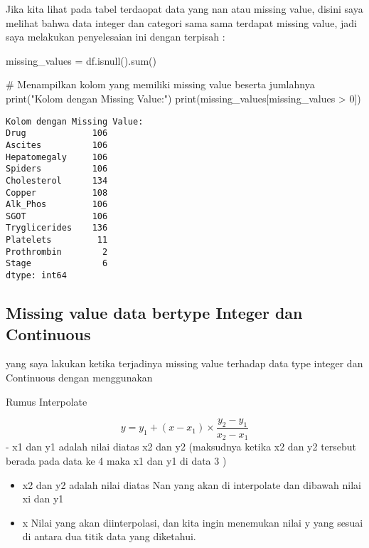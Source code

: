 \documentclass[
  letterpaper,
]{krantz}
\makeatletter
\newenvironment{Shaded}{\begin{snugshade}}{\end{snugshade}}
\newcommand{\BuiltInTok}[1]{\textcolor[rgb]{0.00,0.23,0.31}{#1}}
\newcommand{\CommentTok}[1]{\textcolor[rgb]{0.37,0.37,0.37}{#1}}
\newcommand{\DecValTok}[1]{\textcolor[rgb]{0.68,0.00,0.00}{#1}}
\newcommand{\NormalTok}[1]{\textcolor[rgb]{0.00,0.23,0.31}{#1}}
\newcommand{\OperatorTok}[1]{\textcolor[rgb]{0.37,0.37,0.37}{#1}}
\newcommand{\StringTok}[1]{\textcolor[rgb]{0.13,0.47,0.30}{#1}}
\newenvironment{kframe}{%
\medskip{}
\setlength{\fboxsep}{.8em}
 \def\at@end@of@kframe{}%
 \ifinner\ifhmode%
  \def\at@end@of@kframe{\end{minipage}}%
  \begin{minipage}{\columnwidth}%
 \fi\fi%
 \def\FrameCommand##1{\hskip\@totalleftmargin \hskip-\fboxsep
 \colorbox{shadecolor}{##1}\hskip-\fboxsep
     \hskip-\linewidth \hskip-\@totalleftmargin \hskip\columnwidth}%
 \MakeFramed {\advance\hsize-\width
   \@totalleftmargin\z@ \linewidth\hsize
   \@setminipage}}%
 {\par\unskip\endMakeFramed%
 \at@end@of@kframe}
\renewenvironment{Shaded}{\begin{kframe}}{\end{kframe}}
\makeatother
\begin{document}
Jika kita lihat pada tabel terdaopat data yang nan atau missing value,
disini saya melihat bahwa data integer dan categori sama sama terdapat
missing value, jadi saya melakukan penyelesaian ini dengan terpisah :

\begin{Shaded}
\begin{Highlighting}[]
\NormalTok{missing\_values }\OperatorTok{=}\NormalTok{ df.isnull().}\BuiltInTok{sum}\NormalTok{()}

\CommentTok{\# Menampilkan kolom yang memiliki missing value beserta jumlahnya}
\BuiltInTok{print}\NormalTok{(}\StringTok{"Kolom dengan Missing Value:"}\NormalTok{)}
\BuiltInTok{print}\NormalTok{(missing\_values[missing\_values }\OperatorTok{\textgreater{}} \DecValTok{0}\NormalTok{])}
\end{Highlighting}
\end{Shaded}

\begin{verbatim}
Kolom dengan Missing Value:
Drug             106
Ascites          106
Hepatomegaly     106
Spiders          106
Cholesterol      134
Copper           108
Alk_Phos         106
SGOT             106
Tryglicerides    136
Platelets         11
Prothrombin        2
Stage              6
dtype: int64
\end{verbatim}

\hypertarget{missing-value-data-bertype-integer-dan-continuous-1}{%
\subsection{Missing value data bertype Integer dan
Continuous}\label{missing-value-data-bertype-integer-dan-continuous-1}}

yang saya lakukan ketika terjadinya missing value terhadap data type
integer dan Continuous dengan menggunakan

Rumus Interpolate

\[
y = y_1 + (x - x_1) \times \frac{{y_2 - y_1}}{{x_2 - x_1}}
\] - x1 dan y1 adalah nilai diatas x2 dan y2 (maksudnya ketika x2 dan y2
tersebut berada pada data ke 4 maka x1 dan y1 di data 3 )

\begin{itemize}
\item
  x2 dan y2 adalah nilai diatas Nan yang akan di interpolate dan dibawah
  nilai xi dan y1
\item
  x Nilai yang akan diinterpolasi, dan kita ingin menemukan nilai y yang
  sesuai di antara dua titik data yang diketahui.
\end{itemize}
\end{document}
